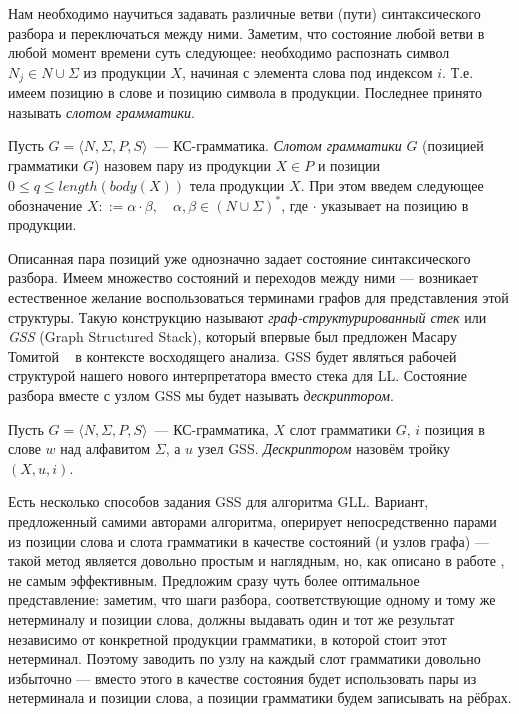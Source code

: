 Нам необходимо научиться задавать различные ветви (пути) синтаксического разбора и переключаться между ними. Заметим, что состояние любой ветви в любой момент времени суть следующее: необходимо распознать символ $N_j \in N \cup \Sigma$ из продукции $X$, начиная с элемента слова под индексом $i$. Т.е. имеем позицию в слове и позицию символа в продукции. Последнее принято называть \textit{слотом грамматики}. 

\begin{definition}
  Пусть $G = \langle N, \Sigma, P, S \rangle$~--- КС-грамматика. \textit{Слотом грамматики} $G$ (позицией грамматики $G$) назовем пару из продукции $X \in P$ и позиции $0 \leq q \leq length(body(X))$ тела продукции $X$. При этом введем следующее обозначение $X ::= \alpha \cdot \beta, \quad \alpha,\beta \in (N \cup \Sigma)^*$, где $ \cdot $ указывает на позицию в продукции.
\end{definition}

Описанная пара позиций уже однозначно задает состояние синтаксического разбора. Имеем множество состояний и переходов между ними --- возникает естественное желание воспользоваться терминами графов для представления этой структуры. Такую конструкцию называют \textit{граф-структурированный стек} или \textit{GSS} (Graph Structured Stack), который впервые был предложен Масару Томитой ~\cite{tomita1988graph} в контексте восходящего анализа. GSS будет являться рабочей структурой нашего нового интерпретатора вместо стека для LL. Состояние разбора вместе с узлом GSS мы будет называть \textit{дескриптором}.

\begin{definition} 
  Пусть $G = \langle N, \Sigma, P, S \rangle$~--- КС-грамматика, $X$ слот грамматики $G$, $i$ позиция в слове $ w $ над алфавитом $\Sigma$, а $ u $ узел GSS. \textit{Дескриптором} назовём тройку $ (X, u, i) $.
\end{definition}

Есть несколько способов задания GSS для алгоритма GLL. Вариант, предложенный самими авторами алгоритма, оперирует непосредственно парами из позиции слова и слота грамматики в качестве состояний (и узлов графа) --- такой метод является довольно простым и наглядным, но, как описано в работе \cite{10.1007/978-3-662-46663-6_5}, не самым эффективным. Предложим сразу чуть более оптимальное представление: заметим, что шаги разбора, соответствующие одному и тому же нетерминалу и позиции слова, должны выдавать один и тот же результат независимо от конкретной продукции грамматики, в которой стоит этот нетерминал. Поэтому заводить по узлу на каждый слот грамматики довольно избыточно --- вместо этого в качестве состояния будет использовать пары из нетерминала и позиции слова, а позиции грамматики будем записывать на рёбрах.  


